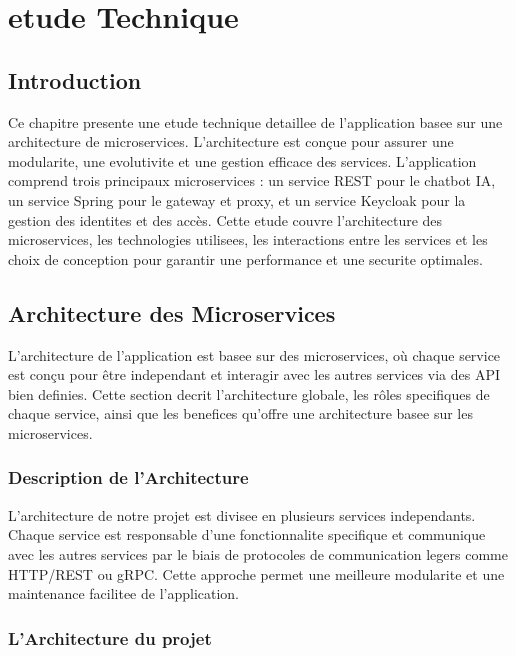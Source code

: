 \documentclass[a4paper, 11pt, openany]{report}
\begin{document}
\chapter{etude Technique}

\section{Introduction}
Ce chapitre presente une etude technique detaillee de l'application basee sur une architecture de microservices. L'architecture est conçue pour assurer une modularite, une evolutivite et une gestion efficace des services. L'application comprend trois principaux microservices : un service REST pour le chatbot IA, un service Spring pour le gateway et proxy, et un service Keycloak pour la gestion des identites et des accès. Cette etude couvre l'architecture des microservices, les technologies utilisees, les interactions entre les services et les choix de conception pour garantir une performance et une securite optimales.

\section{Architecture des Microservices}

L'architecture de l'application est basee sur des microservices, où chaque service est conçu pour être independant et interagir avec les autres services via des API bien definies. Cette section decrit l'architecture globale, les rôles specifiques de chaque service, ainsi que les benefices qu'offre une architecture basee sur les microservices.

\subsection{Description de l'Architecture}

L'architecture de notre projet est divisee en plusieurs services independants. Chaque service est responsable d'une fonctionnalite specifique et communique avec les autres services par le biais de protocoles de communication legers comme HTTP/REST ou gRPC. Cette approche permet une meilleure modularite et une maintenance facilitee de l'application.




\newpage



\subsection{L'Architecture du projet}
\end{document}
